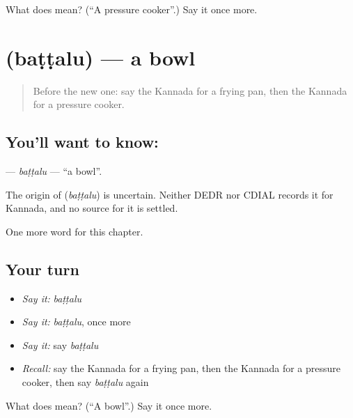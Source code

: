 \begin{tcolorbox}[breakable,colback=teal!4,colframe=teal!35!black,title={Before you move on}]
What does  mean? (\textquotedblleft{}A pressure cooker\textquotedblright{}.) Say it once more.
\end{tcolorbox}
\section[\texorpdfstring{\kn{ಬಟ್ಟಲು} (baṭṭalu)}{ಬಟ್ಟಲು (baṭṭalu)}]{ (baṭṭalu) — a bowl}

\label{lesson:KA-C183-battalu}



\begin{quote}
Before the new one: say the Kannada for a frying pan, then the Kannada for a pressure cooker.
\end{quote}

\subsection*{You'll want to know: }
\textbf{} — \emph{baṭṭalu} — \textquotedblleft{}a bowl\textquotedblright{}.

\begin{cousinweb}
The origin of \textbf{} (\emph{baṭṭalu}) is uncertain. Neither DEDR nor CDIAL records it for Kannada, and no source for it is settled.
\end{cousinweb}

\begin{grammarlens}[title={What you've built}]
One more word for this chapter.
\end{grammarlens}

\subsection*{Your turn}
\begin{itemize}
\raggedright
  \item \emph{Say it:} \emph{baṭṭalu}
  \item \emph{Say it:} \emph{baṭṭalu}, once more
  \item \emph{Say it:} say \emph{baṭṭalu}
  \item \emph{Recall:} say the Kannada for a frying pan, then the Kannada for a pressure cooker, then say \emph{baṭṭalu} again
\end{itemize}

\begin{tcolorbox}[breakable,colback=teal!4,colframe=teal!35!black,title={Before you move on}]
What does  mean? (\textquotedblleft{}A bowl\textquotedblright{}.) Say it once more.
\end{tcolorbox}
